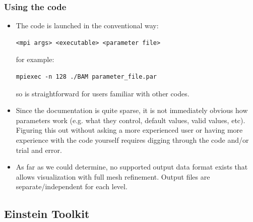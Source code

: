 \documentclass[12pt,a4paper]{article}
\numberwithin{figure}{subsection}
\begin{document}
\subsubsection{Using the code}
\begin{itemize}
    \item The code is launched in the conventional way:
    \begin{lstlisting}[style=shortcode]
        <mpi args> <executable> <parameter file>
    \end{lstlisting}
    for example:
    \begin{lstlisting}[style=shortcode]
        mpiexec -n 128 ./BAM parameter_file.par
    \end{lstlisting}
    so is straightforward for users familiar with other codes.
    \item Since the documentation is quite sparse, it is not immediately obvious
    how parameters work (e.g. what they control, default values, valid values,
    etc). Figuring this out without asking a more experienced user or having
    more experience with the code yourself requires digging through the code
    and/or trial and error.
    \item As far as we could determine, no supported output data
    format exists that allows visualization with full mesh refinement. Output files
    are separate/independent for each level.
\end{itemize}

\subsection{Einstein Toolkit}
\end{document}
